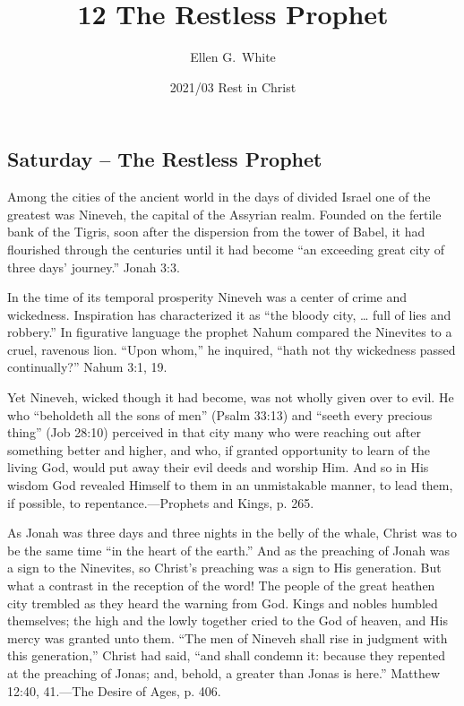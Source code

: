 \documentclass[a4paper, 10pt, twoside, headings=small]{scrartcl}
\title{12 The Restless Prophet}
\author{Ellen G.\ White}
\date{2021/03 Rest in Christ}
\begin{document}
\maketitle

\thispagestyle{empty}

\pagestyle{fancy}

\begin{multicols}{2}

\section*{Saturday – The Restless Prophet}

Among the cities of the ancient world in the days of divided Israel one of the greatest was Nineveh, the capital of the Assyrian realm. Founded on the fertile bank of the Tigris, soon after the dispersion from the tower of Babel, it had flourished through the centuries until it had become “an exceeding great city of three days’ journey.” Jonah 3:3.

In the time of its temporal prosperity Nineveh was a center of crime and wickedness. Inspiration has characterized it as “the bloody city, … full of lies and robbery.” In figurative language the prophet Nahum compared the Ninevites to a cruel, ravenous lion. “Upon whom,” he inquired, “hath not thy wickedness passed continually?” Nahum 3:1, 19.

Yet Nineveh, wicked though it had become, was not wholly given over to evil. He who “beholdeth all the sons of men” (Psalm 33:13) and “seeth every precious thing” (Job 28:10) perceived in that city many who were reaching out after something better and higher, and who, if granted opportunity to learn of the living God, would put away their evil deeds and worship Him. And so in His wisdom God revealed Himself to them in an unmistakable manner, to lead them, if possible, to repentance.—Prophets and Kings, p. 265.

As Jonah was three days and three nights in the belly of the whale, Christ was to be the same time “in the heart of the earth.” And as the preaching of Jonah was a sign to the Ninevites, so Christ’s preaching was a sign to His generation. But what a contrast in the reception of the word! The people of the great heathen city trembled as they heard the warning from God. Kings and nobles humbled themselves; the high and the lowly together cried to the God of heaven, and His mercy was granted unto them. “The men of Nineveh shall rise in judgment with this generation,” Christ had said, “and shall condemn it: because they repented at the preaching of Jonas; and, behold, a greater than Jonas is here.” Matthew 12:40, 41.—The Desire of Ages, p. 406.


\end{multicols}
\end{document}
